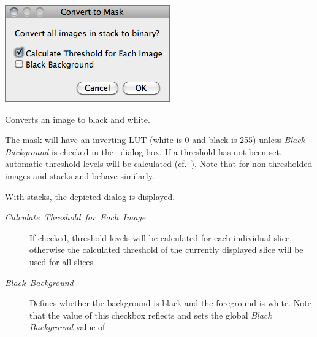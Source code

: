 \begin{minipage}[c][1\totalheight][t]{0.385\columnwidth}%
\includegraphics[scale=0.55]{images/ConvertToMask}%
\end{minipage}%
\begin{minipage}[c][1\totalheight][t]{0.615\columnwidth}%
Converts an image to black and white. \medskip{}


The mask will have an inverting LUT (white is 0 and black is 255)
unless \emph{Black Background} is checked in the \ dialog
box. If a threshold has not been set, automatic threshold levels will
be calculated (cf.\ ).
Note that for non-thresholded images and stacks 
and  behave similarly.%
\end{minipage}

With stacks, the depicted dialog is displayed.
\begin{description}
\item [{\emph{Calculate\ Threshold\ for\ Each\ Image}}] If checked,
threshold levels will be calculated for each individual slice, otherwise
the calculated threshold of the currently displayed slice will be
used for all slices
\item [{\emph{Black}\ \emph{Background}}] Defines whether the background
is black and the foreground is white. Note that the value of this
checkbox reflects and sets the global \emph{Black Background} value
of 
\end{description}



